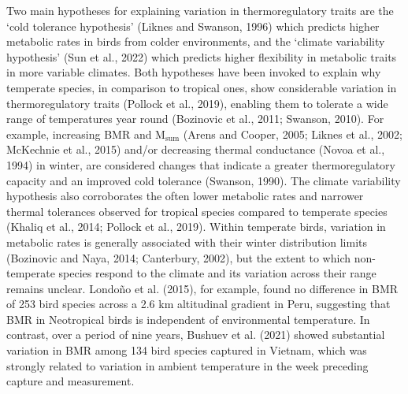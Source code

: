 \documentclass[10pt, twoside]{book} %
\begin{document}
Two main hypotheses for explaining variation in thermoregulatory traits are the ‘cold tolerance hypothesis’ (Liknes and Swanson, 1996) which predicts higher metabolic rates in birds from colder environments, and the ‘climate variability hypothesis’ (Sun et al., 2022) which predicts higher flexibility in metabolic traits in more variable climates. Both hypotheses have been invoked to explain why temperate species, in comparison to tropical ones, show considerable variation in thermoregulatory traits (Pollock et al., 2019), enabling them to tolerate a wide range of temperatures year round (Bozinovic et al., 2011; Swanson, 2010). For example, increasing BMR and M$_{\text{sum}}$ (Arens and Cooper, 2005; Liknes et al., 2002; McKechnie et al., 2015) and/or decreasing thermal conductance (Novoa et al., 1994) in winter, are considered changes that indicate a greater thermoregulatory capacity and an improved cold tolerance (Swanson, 1990). The climate variability hypothesis also corroborates the often lower metabolic rates and narrower thermal tolerances observed for tropical species compared to temperate species (Khaliq et al., 2014; Pollock et al., 2019). Within temperate birds, variation in metabolic rates is generally associated with their winter distribution limits (Bozinovic and Naya, 2014; Canterbury, 2002), but the extent to which non-temperate species respond to the climate and its variation across their range remains unclear. Londoño et al. (2015), for example, found no difference in BMR of 253 bird species across a 2.6 km altitudinal gradient in Peru, suggesting that BMR in Neotropical birds is independent of environmental temperature. In contrast, over a period of nine years, Bushuev et al. (2021) showed substantial variation in BMR among 134 bird species captured in Vietnam, which was strongly related to variation in ambient temperature in the week preceding capture and measurement.\\
\end{document}
